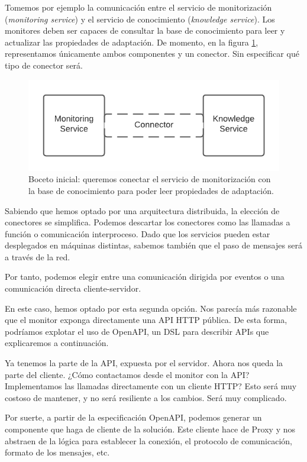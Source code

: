 Tomemos por ejemplo la comunicación entre el servicio de monitorización (\textit{monitoring service}) y el servicio de conocimiento (\textit{knowledge service}). Los monitores deben ser capaces de consultar la base de conocimiento para leer y actualizar las propiedades de adaptación. De momento, en la figura \ref{fig:monitor-knowledge-initial}, representamos únicamente ambos componentes y un conector. Sin especificar qué tipo de conector será.

\begin{figure}[h]
  \centering
  \includegraphics{02_arquitectura/images/Monitor-Knowledge-Initial-Connector}
  \caption{Boceto inicial: queremos conectar el servicio de monitorización con la base de conocimiento para poder leer propiedades de adaptación.}
  \label{fig:monitor-knowledge-initial}
\end{figure}

Sabiendo que hemos optado por una arquitectura distribuida, la elección de conectores se simplifica. Podemos descartar los conectores como las llamadas a función o comunicación interproceso. Dado que los servicios pueden estar desplegados en máquinas distintas, sabemos también que el paso de mensajes será a través de la red.

Por tanto, podemos elegir entre una comunicación dirigida por eventos o una comunicación directa cliente-servidor.

En este caso, hemos optado por esta segunda opción. Nos parecía más razonable que el monitor exponga directamente una API HTTP pública. De esta forma, podríamos explotar el uso de OpenAPI, un DSL para describir APIs que explicaremos a continuación.

Ya tenemos la parte de la API, expuesta por el servidor. Ahora nos queda la parte del cliente. ¿Cómo contactamos desde el monitor con la API? Implementamos las llamadas directamente con un cliente HTTP? Esto será muy costoso de mantener, y no será resiliente a los cambios. Será muy complicado.

Por suerte, a partir de la especificación OpenAPI, podemos generar un componente que haga de cliente de la solución. Este cliente hace de Proxy y nos abstraen de la lógica para establecer la conexión, el protocolo de comunicación, formato de los mensajes, etc.

